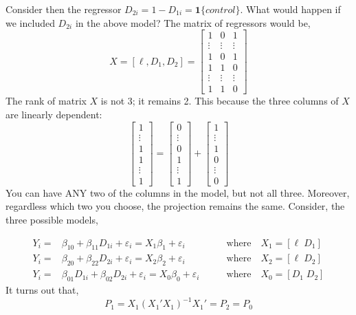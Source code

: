 \documentclass[
  letterpaper,
  DIV=11,
  numbers=noendperiod]{scrreprt}
\begin{document}
Consider then the regressor
\(D_{2i} = 1-D_{1i} = \mathbf{1}\{control\}\). What would happen if we
included \(D_{2i}\) in the above model? The matrix of regressors would
be, \[
X=[\ell,D_1,D_2]=\begin{bmatrix}1 & 0 &1 \\ \vdots & \vdots & \vdots \\ 1 & 0 &1 \\ 1 & 1 &0\\ \vdots & \vdots & \vdots \\ 1 & 1 & 0 \end{bmatrix}
\] The rank of matrix \(X\) is not 3; it remains 2. This because the
three columns of \(X\) are linearly dependent: \[
\begin{bmatrix}1 \\ \vdots \\ 1 \\ 1 \\ \vdots \\ 1 \end{bmatrix}=\begin{bmatrix}0 \\ \vdots \\ 0 \\ 1 \\ \vdots \\ 1 \end{bmatrix}+\begin{bmatrix}1 \\ \vdots \\ 1 \\ 0\\  \vdots \\  0 \end{bmatrix}
\] You can have ANY two of the columns in the model, but not all three.
Moreover, regardless which two you choose, the projection remains the
same. Consider, the three possible models,

\[
\begin{align}
Y_i =& \beta_{10}+\beta_{11} D_{1i}+\varepsilon_i=X_1\beta_1+\varepsilon_i & \qquad\text{where} \quad X_1 = [\ell\;D_1] \\
Y_i =& \beta_{20}+\beta_{22} D_{2i}+\varepsilon_i=X_2\beta_2+\varepsilon_i & \qquad\text{where} \quad X_2 = [\ell\;D_2] \\
Y_i =& \beta_{01}D_{1i} + \beta_{02}D_{2i}+\varepsilon_i=X_0\beta_0+\varepsilon_i & \qquad\text{where} \quad X_0 = [D_1\;D_2] 
\end{align}
\] It turns out that, \[
P_1 = X_1(X_1'X_1)^{-1}X_1' = P_2 = P_0
\]
\end{document}
